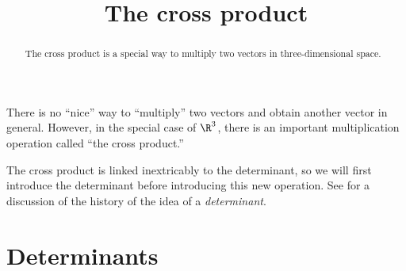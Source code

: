\documentclass{ximera}
\title[Dig-In:]{The cross product}
\begin{document}
\begin{abstract}
  The cross product is a special way to multiply two vectors in
  three-dimensional space.
\end{abstract}
\maketitle

There is no ``nice'' way to ``multiply'' two vectors and obtain
another vector in general. However, in the special case of $\R^3$,
there is an important multiplication operation called ``the cross
product.''

The cross product is linked inextricably to the determinant, so we
will first introduce the determinant before introducing this new
operation. See 
for a discussion of the history of the idea of a \textit{determinant}.

\section{Determinants}
\end{document}
